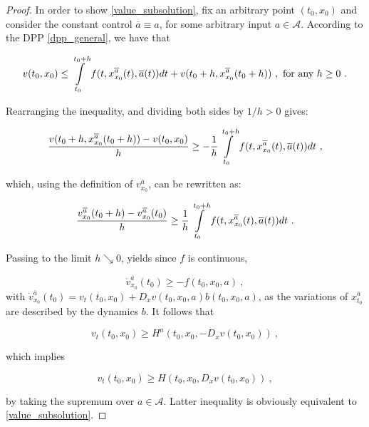 \begin{theorem}
\begin{proof}
		In order to show \eqref{value_subsolution}, fix an arbitrary point $ (t_0, x_0) $ and consider the constant control $ \overline{a} \equiv a $, for some arbitrary input $ a \in \mathcal{A} $.
		According to the DPP \eqref{dpp_general}, we have that
		
		\begin{equation*}
			v(t_0, x_0) \leq \pathint{\overline{a}}{t_0}{t_0 + h} + v(t_0 + h,  x^{\overline{a}}_{x_0}(t_0 + h)) \ , \hbox{ for any } h \geq 0 \ .
		\end{equation*}
		
		Rearranging the inequality, and dividing both sides by $ 1 / h > 0 $ gives:
		
		\begin{equation}
			\label{diff_quotient_sub}
			\frac{v(t_0 + h, x^{\overline{a}}_{x_0}(t_0 + h)) - v(t_0, x_0)}{h} \geq - \frac{1}{h} \pathint{\overline{a}}{t_0}{t_0 + h} \ ,
		\end{equation}
		
		which, using the definition of $ v^{\overline{a}}_{x_0} $, can be rewritten as:
		
		\begin{equation*}
			\frac{v^{\overline{a}}_{x_0}(t_0 + h) - v^{\overline{a}}_{x_0}(t_0)}{h} \geq \frac{1}{h} \pathint{\overline{a}}{t_0}{t_0 + h} \ .
		\end{equation*}
		
		Passing to the limit $ h \searrow 0 $, yields since $ f $ is continuous,
		
		\begin{equation*}
			\dot{v}^{\overline{a}}_{x_0}(t_0) \geq - f(t_0, x_0, a) \ ,
		\end{equation*}
		with $ \dot{v}^{\overline{a}}_{x_0}(t_0) = v_t(t_0, x_0) +  D_x v(t_0, x_0, a) b(t_0, x_0, a) $, as the variations of $ x^{\overline{a}}_{t_0} $ are described by the dynamics $ b $. It follows that
		
		\begin{equation*}
			v_t(t_0, x_0) \geq H^{a}(t_0, x_0, - D_x v(t_0, x_0)) \ ,
		\end{equation*}
		
		which implies
		
		\begin{equation*}
			v_t(t_0, x_0) \geq H(t_0, x_0, D_x v(t_0, x_0)) \ ,
		\end{equation*}
		
		by taking the supremum over $ a \in \mathcal{A} $. Latter inequality is obviously equivalent to \eqref{value_subsolution}.
		

\end{proof}
\end{theorem}
